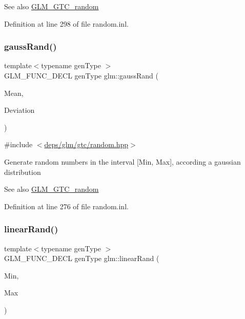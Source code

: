 \begin{DoxySeeAlso}{See also}
\hyperlink{group__gtc__random}{G\+L\+M\+\_\+\+G\+T\+C\+\_\+random} 
\end{DoxySeeAlso}


Definition at line 298 of file random.\+inl.

\mbox{\label{group__gtc__random_ga5193a83e49e4fdc5652c084711083574}} 
\subsubsection{\texorpdfstring{gauss\+Rand()}{gaussRand()}}
{\footnotesize\ttfamily template$<$typename gen\+Type $>$ \\
G\+L\+M\+\_\+\+F\+U\+N\+C\+\_\+\+D\+E\+CL gen\+Type glm\+::gauss\+Rand (\begin{DoxyParamCaption}\item[{gen\+Type}]{Mean,  }\item[{gen\+Type}]{Deviation }\end{DoxyParamCaption})}



{\ttfamily \#include $<$\hyperlink{random_8hpp}{deps/glm/gtc/random.\+hpp}$>$}

Generate random numbers in the interval \mbox{[}Min, Max\mbox{]}, according a gaussian distribution

\begin{DoxySeeAlso}{See also}
\hyperlink{group__gtc__random}{G\+L\+M\+\_\+\+G\+T\+C\+\_\+random} 
\end{DoxySeeAlso}


Definition at line 276 of file random.\+inl.

\mbox{\label{group__gtc__random_ga04e241ab88374a477a2c2ceadd2fa03d}} 
\subsubsection{\texorpdfstring{linear\+Rand()}{linearRand()}\hspace{0.1cm}{\footnotesize\ttfamily [1/2]}}
{\footnotesize\ttfamily template$<$typename gen\+Type $>$ \\
G\+L\+M\+\_\+\+F\+U\+N\+C\+\_\+\+D\+E\+CL gen\+Type glm\+::linear\+Rand (\begin{DoxyParamCaption}\item[{gen\+Type}]{Min,  }\item[{gen\+Type}]{Max }\end{DoxyParamCaption})}



